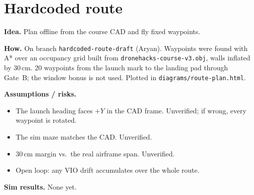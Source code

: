 \section{Hardcoded route}
\textbf{Idea.} Plan offline from the course CAD and fly fixed waypoints.

\textbf{How.} On branch \texttt{hardcoded-route-draft} (Aryan). Waypoints were found with A*
over an occupancy grid built from \texttt{dronehacks-course-v3.obj}, walls inflated by
30\,cm. 20 waypoints from the launch mark to the landing pad through Gate~B; the window
bonus is not used. Plotted in \texttt{diagrams/route-plan.html}.

\textbf{Assumptions / risks.}
\begin{itemize}
  \item The launch heading faces $+Y$ in the CAD frame. Unverified; if wrong, every waypoint is rotated.
  \item The sim maze matches the CAD. Unverified.
  \item 30\,cm margin vs.\ the real airframe span. Unverified.
  \item Open loop: any VIO drift accumulates over the whole route.
\end{itemize}

\textbf{Sim results.} None yet.
